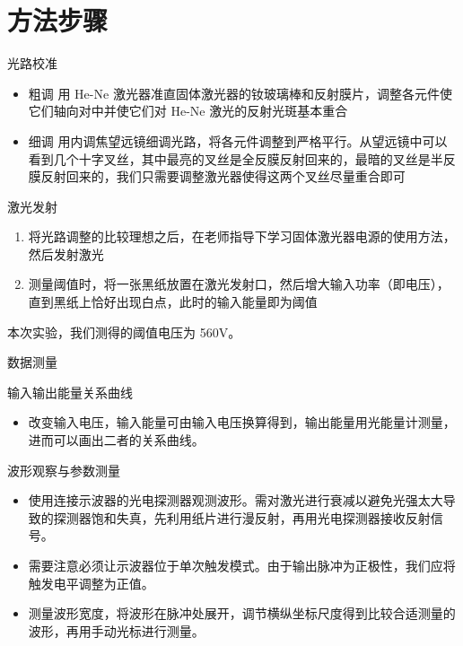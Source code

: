 \documentclass{beamer}
\begin{document}
\section{方法步骤}
\begin{frame}{光路校准}
  \begin{itemize}
    \item \alert{粗调} 用 He-Ne 激光器准直固体激光器的钕玻璃棒和反射膜片，调整各元件使它们轴向对中并使它们对 He-Ne 激光的反射光斑基本重合
    \item \alert{细调} 用内调焦望远镜细调光路，将各元件调整到严格平行。从望远镜中可以看到几个十字叉丝，其中最亮的叉丝是全反膜反射回来的，最暗的叉丝是半反膜反射回来的，我们只需要调整激光器使得这两个叉丝尽量重合即可
    
  \end{itemize}
\end{frame}
\begin{frame}{激光发射}
  \begin{enumerate}
    \item 将光路调整的比较理想之后，在老师指导下学习固体激光器电源的使用方法，然后发射激光
    \item 测量阈值时，将一张黑纸放置在激光发射口，然后增大输入功率（即电压），直到黑纸上恰好出现白点，此时的输入能量即为阈值
  \end{enumerate}
  本次实验，我们测得的阈值电压为 560V。
\end{frame}
\begin{frame}{数据测量}
\begin{block}{输入输出能量关系曲线}
  \begin{itemize}
    \item 改变输入电压，输入能量可由输入电压换算得到，输出能量用光能量计测量，进而可以画出二者的关系曲线。
  \end{itemize}
\end{block}
\begin{block}{波形观察与参数测量}
  \begin{itemize}
    \item 使用连接示波器的光电探测器观测波形。需对激光进行衰减以避免光强太大导致的探测器饱和失真，先利用纸片进行漫反射，再用光电探测器接收反射信号。
    \item 需要注意必须让示波器位于单次触发模式。由于输出脉冲为正极性，我们应将触发电平调整为正值。
    \item 测量波形宽度，将波形在脉冲处展开，调节横纵坐标尺度得到比较合适测量的波形，再用手动光标进行测量。
  \end{itemize}
 
\end{block}
\end{frame}
\end{document}
